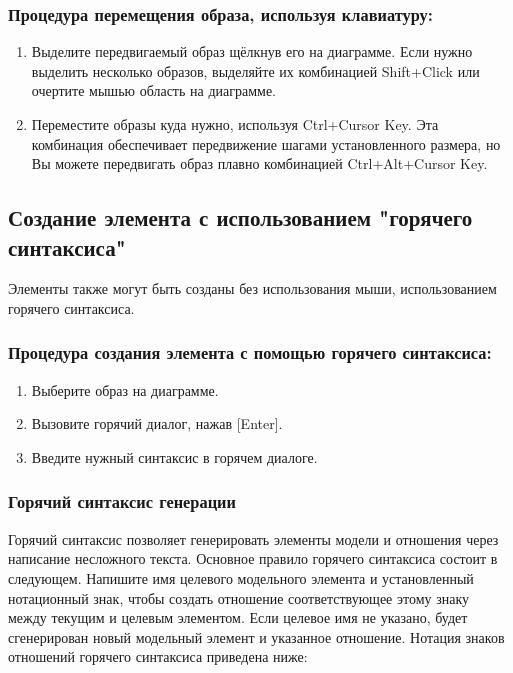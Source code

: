 \documentclass[a4paper,12pt]{report}
\begin{document}
\subsubsection*{Процедура перемещения образа, используя клавиатуру:}
\begin{enumerate}
	\item Выделите передвигаемый образ щёлкнув его на диаграмме. Если нужно выделить несколько
	образов, выделяйте их комбинацией Shift+Click или очертите мышью область на диаграмме.
	\item Переместите образы куда нужно, используя Ctrl+Cursor Key. Эта комбинация обеспечивает
	передвижение шагами установленного размера, но Вы можете передвигать образ плавно
	комбинацией Ctrl+Alt+Cursor Key.
\end{enumerate}


\subsection*{Создание элемента с использованием "горячего синтаксиса"}
Элементы также могут быть созданы без использования мыши, использованием горячего
синтаксиса.
\subsubsection*{Процедура создания элемента с помощью горячего синтаксиса:}
\begin{enumerate}
	\item Выберите образ на диаграмме.
	\item Вызовите горячий диалог, нажав [Enter].
	\item Введите нужный синтаксис в горячем диалоге.
\end{enumerate}

\subsubsection*{Горячий синтаксис генерации}
Горячий синтаксис позволяет генерировать элементы модели и отношения через написание
несложного текста. Основное правило горячего синтаксиса состоит в следующем. Напишите имя
целевого модельного элемента и установленный нотационный знак, чтобы создать отношение
соответствующее этому знаку между текущим и целевым элементом. Если целевое имя не указано,
будет сгенерирован новый модельный элемент и указанное отношение. Нотация знаков отношений горячего синтаксиса приведена ниже:
\end{document}
